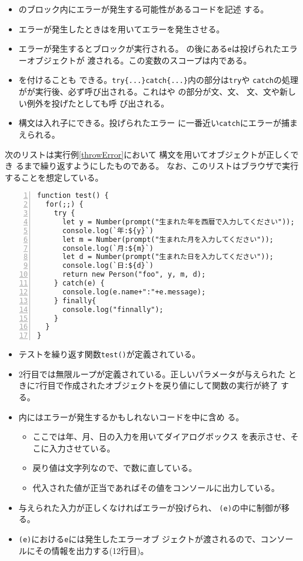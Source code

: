 \begin{itemize}
 \item {}のブロック内にエラーが発生する可能性があるコードを記述
       する。
 \item エラーが発生したときはを用いてエラーを発生させる。
 \item エラーが発生するとブロックが実行される。
       の後にある\texttt{e}は投げられたエラーオブジェクトが
       渡される。この変数のスコープは内である。
 \item {}を付けることも
できる。\texttt{try\{...\}catch\{...\}}内の部分は\texttt{try}や
\texttt{catch}の処理がが実行後、必ず呼び出される。これはや
       の部分が文、文、
       文、文や新しい例外を投げたとしても呼
       び出される。
 \item {}構文は入れ子にできる。投げられたエラー
			 に一番近い\texttt{catch}にエラーが捕まえられる。
\end{itemize}
 \begin{Exec}\upshape
	次のリストは実行例\ref{throwError}において
  構文を用いてオブジェクトが正しくでき
	るまで繰り返すようにしたものである。
 なお、このリストはブラウザで実行することを想定している。
 \end{Exec}
\begin{Verbatim}[numbers=left]
function test() {
  for(;;) {
    try {
      let y = Number(prompt("生まれた年を西暦で入力してください"));
      console.log(`年:${y}`)
      let m = Number(prompt("生まれた月を入力してください"));
      console.log(`月:${m}`)
      let d = Number(prompt("生まれた日を入力してください"));
      console.log(`日:${d}`)
      return new Person("foo", y, m, d);
    } catch(e) {
      console.log(e.name+":"+e.message);
    } finally{
      console.log("finnally");
    }
  }
}
\end{Verbatim}
\begin{itemize}
 \item テストを繰り返す関数\texttt{test()}が定義されている。
 \item 2行目では無限ループが定義されている。正しいパラメータが与えられた
			 ときに7行目で作成されたオブジェクトを戻り値にして関数の実行が終了
			 する。
 \item {}内にはエラーが発生するかもしれないコードを中に含め
			 る。
	\begin{itemize}
	 \item ここでは年、月、日の入力を用いてダイアログボックス
				 を表示させ、そこに入力させている。
	 \item 戻り値は文字列なので、で数に直している。
   \item 代入された値が正当であればその値をコンソールに出力している。
	\end{itemize}
 \item 与えられた入力が正しくなければエラーが投げられ、
			 \texttt{(e)}の中に制御が移る。
 \item {}\texttt{(e)}における\texttt{e}には発生したエラーオブ
			 ジェクトが渡されるので、コンソールにその情報を出力する(12行目)。
\end{itemize}
